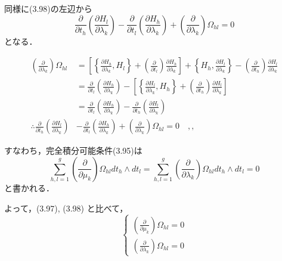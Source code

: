 \begin{story}
同様に(3.98)の左辺から
\begin{equation*}
    \frac{\partial}{\partial t_h} \left( \frac{\partial H_l}{\partial \lambda_k} \right) - \frac{\partial}{\partial t_l} \left( \frac{\partial H_h}{\partial \lambda_k} \right) + \left( \frac{\partial}{\partial \lambda_k} \right) \Omega_{hl} = 0
\end{equation*}
となる．
\end{story}
\begin{align*}
    \left( \frac{\partial}{\partial \lambda_k} \right) \Omega_{hl} &= \left[ \left\{ \frac{\partial H_h}{\partial \lambda_k}, H_l \right\} + \left( \frac{\partial}{\partial t_l} \right) \frac{\partial H_h}{\partial \lambda_k} \right] + \left\{ H_h, \frac{\partial H_l}{\partial \lambda_k} \right\} - \left( \frac{\partial}{\partial t_h} \right) \frac{\partial H_l}{\partial \lambda_k} \\
    &= \frac{\partial}{\partial t_l} \left( \frac{\partial H_h}{\partial \lambda_k} \right) - \left[ \left\{ \frac{\partial H_l}{\partial \lambda_k}, H_h \right\} + \left( \frac{\partial}{\partial t_h} \right) \frac{\partial H_l}{\partial \lambda_k} \right] \\
    &= \frac{\partial}{\partial t_l} \left( \frac{\partial H_h}{\partial \lambda_k} \right) - \frac{\partial}{\partial t_h} \left( \frac{\partial H_l}{\partial \lambda_k} \right) \\
    \therefore \frac{\partial}{\partial t_h} \left( \frac{\partial H_l}{\partial \lambda_k} \right) &- \frac{\partial}{\partial t_l} \left( \frac{\partial H_h}{\partial \lambda_k} \right) + \left( \frac{\partial}{\partial \lambda_k} \right) \Omega_{hl} = 0 \quad ,,
\end{align*}
\begin{story}
すなわち，完全積分可能条件(3.95)は
\begin{equation}
    \sum_{h,l=1}^g \left( \frac{\partial}{\partial \mu_k} \right) \Omega_{hl} dt_h \wedge dt_l = \sum_{h,l=1}^g \left( \frac{\partial}{\partial \lambda_k} \right) \Omega_{hl} dt_h \wedge dt_l = 0 \tag{3.101}
\end{equation}
と書かれる．
\end{story}
\vspace{1em}
\noindent
よって，(3.97), (3.98) と比べて，
\begin{equation*}
    \begin{cases}
        \displaystyle \left( \frac{\partial}{\partial \mu_k} \right) \Omega_{hl} = 0 \\[1.5em]
        \displaystyle \left( \frac{\partial}{\partial \lambda_k} \right) \Omega_{hl} = 0
    \end{cases}
\end{equation*}
